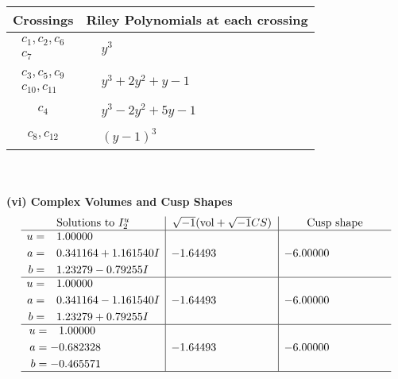 \documentclass[1p]{elsarticle_modified}
\theoremstyle{definition}
\newcommand{\I}{\sqrt{-1}}
\begin{document}
\begin{tabular}{m{50pt}|m{274pt}}
Crossings & \hspace{64pt}Riley Polynomials at each crossing \\
\hline $$\begin{aligned}c_{1},c_{2},c_{6}\\c_{7}\end{aligned}$$&$\begin{aligned}
&y^3
\end{aligned}$\\
\hline $$\begin{aligned}c_{3},c_{5},c_{9}\\c_{10},c_{11}\end{aligned}$$&$\begin{aligned}
&y^3+2 y^2+y-1
\end{aligned}$\\
\hline $$\begin{aligned}c_{4}\end{aligned}$$&$\begin{aligned}
&y^3-2 y^2+5 y-1
\end{aligned}$\\
\hline $$\begin{aligned}c_{8},c_{12}\end{aligned}$$&$\begin{aligned}
&(y-1)^3
\end{aligned}$\\
\hline
\end{tabular}\\~\\
\newpage\flushleft \textbf{(vi) Complex Volumes and Cusp Shapes}
$$\begin{array}{c|c|c}  
\text{Solutions to }I^u_{2}& \I (\text{vol} + \sqrt{-1}CS) & \text{Cusp shape}\\
 \hline 
\begin{aligned}
u &= \phantom{-}1.00000\phantom{ +0.000000I} \\
a &= \phantom{-}0.341164 + 1.161540 I \\
b &= \phantom{-}1.23279 - 0.79255 I\end{aligned}
 & -1.64493\phantom{ +0.000000I} & -6.00000\phantom{ +0.000000I} \\ \hline\begin{aligned}
u &= \phantom{-}1.00000\phantom{ +0.000000I} \\
a &= \phantom{-}0.341164 - 1.161540 I \\
b &= \phantom{-}1.23279 + 0.79255 I\end{aligned}
 & -1.64493\phantom{ +0.000000I} & -6.00000\phantom{ +0.000000I} \\ \hline\begin{aligned}
u &= \phantom{-}1.00000\phantom{ +0.000000I} \\
a &= -0.682328\phantom{ +0.000000I} \\
b &= -0.465571\phantom{ +0.000000I}\end{aligned}
 & -1.64493\phantom{ +0.000000I} & -6.00000\phantom{ +0.000000I}\\
 \hline 
 \end{array}$$\newpage\newpage\renewcommand{\arraystretch}{1}
\end{document}
